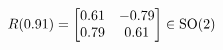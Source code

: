 \documentclass[preview]{standalone}
\begin{document}
\begin{align*}
\special{dvisvgm:raw <g id='unique000'>}R(0.91) = \begin{bmatrix} 0.61 & -0.79 \\ 0.79 & 0.61 \end{bmatrix} \in \text{SO}(2)\special{dvisvgm:raw </g>}
\end{align*}
\end{document}
